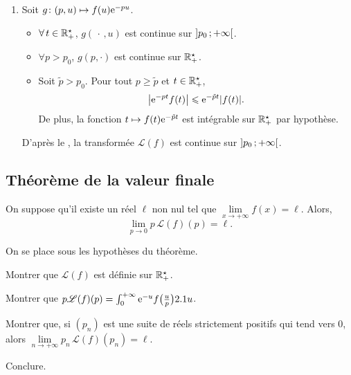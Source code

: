 \begin{demo}
\begin{enumerate}
\item Soit $\fonctionligne[g]{(p, u)}{f(u) \e^{-p u}}$.
\begin{itemize}
\item $\forall t \in \Rpe$, $g(\,\cdot\,, u)$ est continue sur $\interoo{p_0}{+\infty}$.
\item $\forall p > p_0$, $g(p, \cdot)$ est continue sur $\Rpe$.
\item Soit $\tilde{p} > p_0$. Pour tout $p \geqslant \tilde{p}$ et $t \in \Rpe$,
\[
\abs{\e^{-p t} f(t)} \leqslant \e^{- \tilde{p} t} \abs{f(t)}.
\]
De plus, la fonction $t \mapsto f(t) \e^{-\tilde{p} t}$ est intégrable sur $\Rpe$ par hypothèse.
\end{itemize}
D'après le , la transformée $\mathscr{L}(f)$ est continue sur $\interoo{p_0}{+\infty}$.
\end{enumerate}
\end{demo}


\subsection{Théorème de la valeur finale}

\begin{theo}
On suppose qu'il existe un réel $\ell$ non nul tel que $\lim\limits_{x \to +\infty} f(x) = \ell$. Alors,
\[
\lim_{p\to 0} p\, \mathscr{L}(f)(p) = \ell.
\]
\end{theo}

\begin{exercice}
On se place sous les hypothèses du théorème.
\begin{questions}
\item Montrer que $\mathscr{L}(f)$ est définie sur $\Rpe$.

\item Montrer que $p \mathscr{L}(f)(p) = \int_0^{+\infty} \e^{-u} f\big(\frac{u}{p}\big) \d u$.

\item Montrer que, si $(p_n)$ est une suite de réels strictement positifs qui tend vers $0$, alors $\lim\limits_{n\to+\infty} p_n\, \mathscr{L}(f)(p_n) = \ell$.

\item Conclure.
\end{questions}
\end{exercice}


